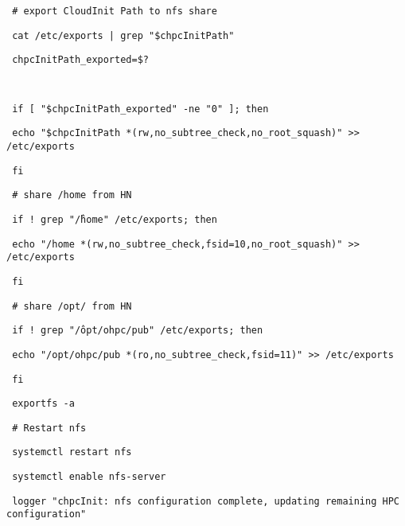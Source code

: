 \begin{section}
\begin{bash}\texttt{\small{ \# export CloudInit Path to nfs share}}\end{bash}
\begin{bash}\texttt{\small{ cat /etc/exports | grep "\$chpcInitPath"}}\end{bash}
\begin{bash}\texttt{\small{ chpcInitPath\_exported=\$?}}\end{bash}
\begin{bash}\texttt{\small{ }}\end{bash}
\begin{bash}\texttt{\small{ if [ "\${chpcInitPath\_exported}" -ne "0" ]; then}}\end{bash}
\begin{bash}\texttt{\small{     echo "\$chpcInitPath *(rw,no\_subtree\_check,no\_root\_squash)" >> /etc/exports}}\end{bash}
\begin{bash}\texttt{\small{ fi}}\end{bash}
\begin{bash}\texttt{\small{ \# share /home from HN}}\end{bash}
\begin{bash}\texttt{\small{ if ! grep "\^/home" /etc/exports; then}}\end{bash}
\begin{bash}\texttt{\small{     echo "/home *(rw,no\_subtree\_check,fsid=10,no\_root\_squash)" >> /etc/exports}}\end{bash}
\begin{bash}\texttt{\small{ fi}}\end{bash}
\begin{bash}\texttt{\small{ \# share /opt/ from HN}}\end{bash}
\begin{bash}\texttt{\small{ if ! grep "\^/opt/ohpc/pub" /etc/exports; then}}\end{bash}
\begin{bash}\texttt{\small{     echo "/opt/ohpc/pub *(ro,no\_subtree\_check,fsid=11)" >> /etc/exports}}\end{bash}
\begin{bash}\texttt{\small{ fi}}\end{bash}
\begin{bash}\texttt{\small{ exportfs -a}}\end{bash}
\begin{bash}\texttt{\small{ \# Restart nfs}}\end{bash}
\begin{bash}\texttt{\small{ systemctl restart nfs}}\end{bash}
\begin{bash}\texttt{\small{ systemctl enable nfs-server}}\end{bash}
\begin{bash}\texttt{\small{ logger "chpcInit: nfs configuration complete, updating remaining HPC configuration" }}\end{bash}


\end{section}
